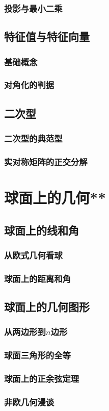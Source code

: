 \subsection{投影与最小二乘}
\clearpage

\section{特征值与特征向量}
\subsection{基础概念}
\clearpage
\subsection{对角化的判据}
\clearpage

\section{二次型}
\subsection{二次型的典范型}
\clearpage
\subsection{实对称矩阵的正交分解}
\clearpage

\chapter{球面上的几何**}

\section{球面上的线和角}
\subsection{从欧式几何看球}
\clearpage
\subsection{球面上的距离和角}

\clearpage

\section{球面上的几何图形}
\subsection{从两边形到\texorpdfstring{\(n\)}s边形}
\clearpage
\subsection{球面三角形的全等}
\clearpage
\subsection{球面上的正余弦定理}
\clearpage






\subsection{非欧几何漫谈}
\clearpage